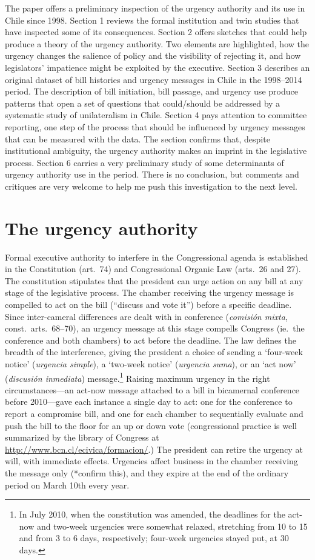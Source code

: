 \documentclass[letter,12pt]{article}
\begin{document}
The paper offers a preliminary inspection of the urgency authority and its use in Chile since 1998. Section 1 reviews the formal institution and twin studies that have inspected some of its consequences. Section 2 offers sketches that could help produce a theory of the urgency authority. Two elements are highlighted, how the urgency changes the salience of policy and the visibility of rejecting it, and how legislators' impatience might be exploited by the executive. Section 3 describes an original dataset of bill histories and urgency messages in Chile in the 1998--2014 period. The description of  bill initiation, bill passage, and urgency use produce patterns that open a set of questions that could/should be addressed by a systematic study of unilateralism in Chile. Section 4 pays attention to committee reporting, one step of the process that should be influenced by urgency messages that can be measured with the data. The section confirms that, despite institutional ambiguity, the urgency authority makes an imprint in the legislative process. Section 6 carries a very preliminary study of some determinants of urgency authority use in the period. There is no conclusion, but comments and critiques are very welcome to help me push this investigation to the next level. 


\section{The urgency authority}

Formal executive authority to interfere in the Congressional agenda is established in the Constitution (art.\ 74) and Congressional Organic Law (arts.\ 26 and 27). The constitution stipulates that the president can urge action on any bill at any stage of the legislative process. The chamber receiving the urgency message is compelled to act on the bill (``discuss and vote it'') before a specific deadline. Since inter-cameral differences are dealt with in conference (\emph{comisión mixta}, const.\ arts.\ 68--70), an urgency message at this stage compells Congress (ie.\ the conference and both chambers) to act before the deadline. The law defines the breadth of the interference, giving the president a choice of sending a `four-week notice' (\emph{urgencia simple}), a `two-week notice' (\emph{urgencia suma}), or an `act now' (\emph{discusión inmediata}) message.\footnote{In July 2010, when the constitution was amended, the deadlines for the act-now and two-week urgencies were somewhat relaxed, stretching from 10 to 15 and from 3 to 6 days, respectively; four-week urgencies stayed put, at 30 days.} Raising maximum urgency in the right circumstances---an act-now message attached to a bill in bicamernal conference before 2010---gave each instance a single day to act: one for the conference to report a compromise bill, and one for each chamber to sequentially evaluate and push the bill to the floor for an up or down vote (congressional practice is well summarized by the library of Congress at \url{http://www.bcn.cl/ecivica/formacion/}.) The president can retire the urgency at will, with immediate effects. Urgencies affect business in the chamber receiving the message only (*confirm this), and they expire at the end of the ordinary period on March 10th every year. 
\end{document}
